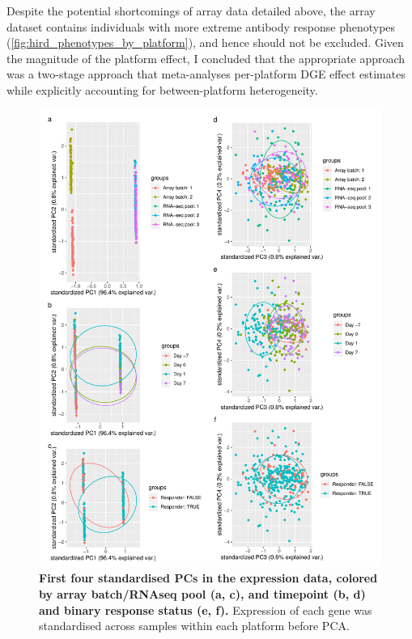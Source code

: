 Despite the potential shortcomings of array data detailed above, the array dataset contains individuals with more extreme antibody response phenotypes (\cref{fig:hird_phenotypes_by_platform}), and hence should not be excluded.
Given the magnitude of the platform effect, I concluded that the appropriate approach was a two-stage approach that meta-analyses per-platform \gls{DGE} effect estimates while explicitly accounting for between-platform heterogeneity.

\begin{figure}
    \includegraphics[width=1.0\textwidth,page=1]{mainmatter/figures/chapter_02/compare_phenotype_by_platform.E_pca.pdf}
    \caption{
        \textbf{First four standardised \glspl{PC} in the expression data, colored by array batch/\gls{RNAseq} pool (a, c), and timepoint (b, d) and binary response status (e, f).}
        Expression of each gene was standardised across samples within each platform before \gls{PCA}.
    }
    \label{fig:hird_expression_pcs}
\end{figure}


